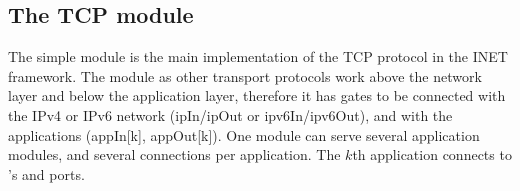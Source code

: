 %
%
%
%
%
%
%
%
%
%


\subsection{The TCP module}
\label{sec:tcp_module}

The  simple module is the main implementation of the TCP protocol in the INET framework.
The  module as other transport protocols work above the network layer and below the application
layer, therefore it has gates to be connected with the IPv4 or IPv6 network (ipIn/ipOut or ipv6In/ipv6Out),
and with the applications (appIn[k], appOut[k]).
One  module can serve several application modules, and several
connections per application. The $k$th application connects to 's
 and  ports.

